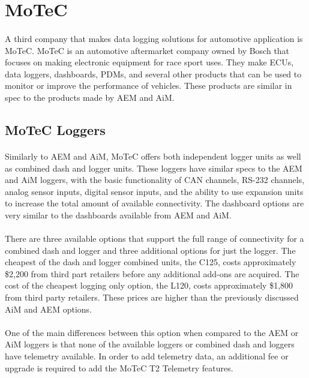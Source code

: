 \section{MoTeC}

\paragraph{}
A third company that makes data logging solutions for automotive application is MoTeC\cite{MoTeCSite}.
MoTeC is an automotive aftermarket company owned by Bosch that focuses on making electronic equipment for race sport uses.
They make ECUs, data loggers, dashboards, PDMs, and several other products that can be used to monitor or improve the performance of vehicles.
These products are similar in spec to the products made by AEM and AiM.

\subsection{MoTeC Loggers}

\paragraph{}
Similarly to AEM and AiM, MoTeC offers both independent logger units as well as combined dash and logger units.
These loggers have similar specs to the AEM and AiM loggers, with the basic functionality of CAN channels, RS-232 channels, analog sensor inputs, digital sensor inputs, and the ability to use expansion units to increase the total amount of available connectivity.
The dashboard options are very similar to the dashboards available from AEM and AiM.

\paragraph{}
There are three available options that support the full range of connectivity for a combined dash and logger and three additional options for just the logger.
The cheapest of the dash and logger combined units, the C125, costs approximately \$2,200 from third part retailers before any additional add-ons are acquired.
The cost of the cheapest logging only option, the L120, costs approximately \$1,800 from third party retailers.
These prices are higher than the previously discussed AiM and AEM options.

\paragraph{}
One of the main differences between this option when compared to the AEM or AiM loggers is that none of the available loggers or combined dash and loggers have telemetry available.
In order to add telemetry data, an additional fee or upgrade is required to add the MoTeC T2 Telemetry features.

